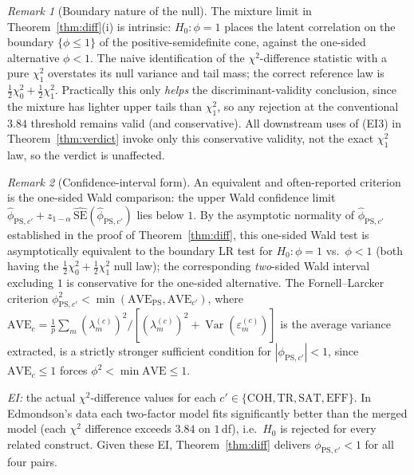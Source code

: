\documentclass{amsart}
\theoremstyle{remark}
\newtheorem{remark}{Remark}
\begin{document}
\begin{remark}[Boundary nature of the null]\label{rem:boundary}
The mixture limit in Theorem~\ref{thm:diff}(i) is intrinsic: $H_0:\phi=1$ places
the latent correlation on the boundary $\{\phi\le1\}$ of the positive-semidefinite
cone, against the one-sided alternative $\phi<1$. The naive identification of the
$\chi^2$-difference statistic with a pure $\chi^2_1$ overstates its null variance
and tail mass; the correct reference law is $\tfrac12\chi^2_0+\tfrac12\chi^2_1$.
Practically this only \emph{helps} the discriminant-validity conclusion, since the
mixture has lighter upper tails than $\chi^2_1$, so any rejection at the
conventional $3.84$ threshold remains valid (and conservative). All downstream uses
of (EI3) in Theorem~\ref{thm:verdict} invoke only this conservative validity, not
the exact $\chi^2_1$ law, so the verdict is unaffected.
\end{remark}

\begin{remark}[Confidence-interval form]
An equivalent and often-reported criterion is the one-sided Wald comparison: the
upper Wald confidence limit
$\hat\phi_{\mathrm{PS},c'}+z_{1-\alpha}\,\widehat{\mathrm{SE}}(\hat\phi_{\mathrm{PS},c'})$
lies below $1$. By the asymptotic normality of $\hat\phi_{\mathrm{PS},c'}$
established in the proof of Theorem~\ref{thm:diff}, this one-sided Wald test is
asymptotically equivalent to the boundary LR test for $H_0:\phi=1$ vs.\ $\phi<1$
(both having the $\tfrac12\chi^2_0+\tfrac12\chi^2_1$ null law); the corresponding
\emph{two}-sided Wald interval excluding $1$ is conservative for the one-sided
alternative. The Fornell--Larcker criterion
$\phi_{\mathrm{PS},c'}^2<\min(\mathrm{AVE}_{\mathrm{PS}},\mathrm{AVE}_{c'})$, where
$\mathrm{AVE}_c=\frac1p\sum_m(\lambda^{(c)}_m)^2/[(\lambda^{(c)}_m)^2+\operatorname{Var}(\varepsilon^{(c)}_m)]$
is the average variance extracted, is a strictly stronger sufficient condition for
$|\phi_{\mathrm{PS},c'}|<1$, since $\mathrm{AVE}_c\le1$ forces
$\phi^2<\min\mathrm{AVE}\le1$.
\end{remark}

\emph{EI:} the actual $\chi^2$-difference values for each $c'\in\{\mathrm{COH,TR,SAT,EFF}\}$.
In Edmondson's data each two-factor model fits significantly better than the merged
model (each $\chi^2$ difference exceeds $3.84$ on $1\,$df), i.e.\ $H_0$ is rejected
for every related construct. Given these EI, Theorem~\ref{thm:diff} delivers
$\phi_{\mathrm{PS},c'}<1$ for all four pairs.
\end{document}
